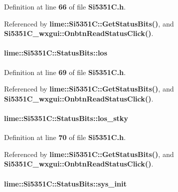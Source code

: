 Definition at line {\bf 66} of file {\bf Si5351\+C.\+h}.



Referenced by {\bf lime\+::\+Si5351\+C\+::\+Get\+Status\+Bits()}, and {\bf Si5351\+C\+\_\+wxgui\+::\+Onbtn\+Read\+Status\+Click()}.

\paragraph[{los}]{ lime\+::\+Si5351\+C\+::\+Status\+Bits\+::los}\label{structlime_1_1Si5351C_1_1StatusBits_a84224ce6cf5bbe56677620efdbb245eb}


Definition at line {\bf 69} of file {\bf Si5351\+C.\+h}.



Referenced by {\bf lime\+::\+Si5351\+C\+::\+Get\+Status\+Bits()}, and {\bf Si5351\+C\+\_\+wxgui\+::\+Onbtn\+Read\+Status\+Click()}.

\paragraph[{los\+\_\+stky}]{ lime\+::\+Si5351\+C\+::\+Status\+Bits\+::los\+\_\+stky}\label{structlime_1_1Si5351C_1_1StatusBits_affa1943c39e8d3f152c7560875b22e85}


Definition at line {\bf 70} of file {\bf Si5351\+C.\+h}.



Referenced by {\bf lime\+::\+Si5351\+C\+::\+Get\+Status\+Bits()}, and {\bf Si5351\+C\+\_\+wxgui\+::\+Onbtn\+Read\+Status\+Click()}.

\paragraph[{sys\+\_\+init}]{ lime\+::\+Si5351\+C\+::\+Status\+Bits\+::sys\+\_\+init}\label{structlime_1_1Si5351C_1_1StatusBits_a3ee0467d6cf8c196b8b1f9f442c862c6}


